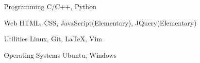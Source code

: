 \begin{cvskills}
  \cvskill
  {Programming}
  { C/C++, Python}

  \cvskill
  {Web}
  {HTML, CSS, JavaScript(Elementary), JQuery(Elementary)}

  \cvskill
  {Utilities}
  {Linux, Git, \LaTeX, Vim}
    
    \cvskill
    {Operating Systems}
    {Ubuntu, Windows }    

\end{cvskills}

